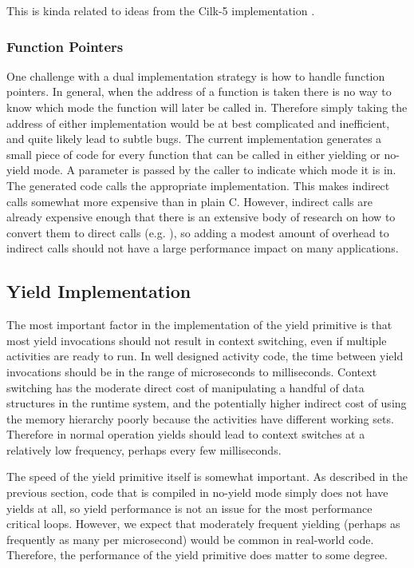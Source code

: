 \documentclass[10pt,preprint]{sigplanconf}
\begin{document}
This is kinda related to ideas from the Cilk-5 implementation
\cite{Frigo1998}.

\subsubsection{Function Pointers}

One challenge with a dual implementation strategy is how to handle function pointers.
In general, when the address of a function is taken there is no way to know which mode the function will later be called in.
Therefore simply taking the address of either implementation would be at best complicated and inefficient, and quite likely lead to subtle bugs.
The current implementation generates a small piece of code for every function that can be called in either yielding or no-yield mode.
A parameter is passed by the caller to indicate which mode it is in.
The generated code calls the appropriate implementation.
This makes indirect calls somewhat more expensive than in plain C.
However, indirect calls are already expensive enough that there is an extensive body of research on how to convert them to direct calls (e.g. \cite{Dean1995}), so adding a modest amount of overhead to indirect calls should not have a large performance impact on many applications.

\subsection{Yield Implementation}

The most important factor in the implementation of the yield primitive is that most yield invocations should not result in context switching, even if multiple activities are ready to run.
In well designed activity code, the time between yield invocations should be in the range of microseconds to milliseconds.
Context switching has the moderate direct cost of manipulating a handful of data structures in the runtime system, and the potentially higher indirect cost of using the memory hierarchy poorly because the activities have different working sets.
Therefore in normal operation yields should lead to context switches at a relatively low frequency, perhaps every few milliseconds.

The speed of the yield primitive itself is somewhat important.
As described in the previous section, code that is compiled in no-yield mode simply does not have yields at all, so yield performance is not an issue for the most performance critical loops.
However, we expect that moderately frequent yielding (perhaps as frequently as many per microsecond) would be common in real-world code.
Therefore, the performance of the yield primitive does matter to some degree.
\end{document}
